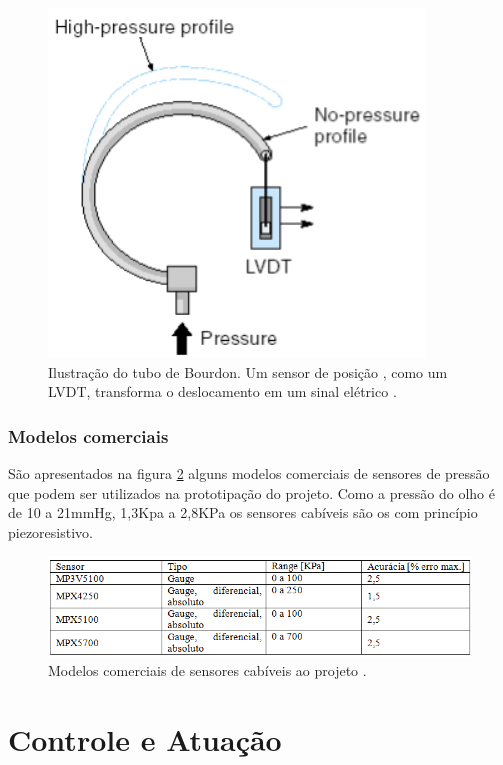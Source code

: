 \begin{anexosenv}
\begin{figure}[htb]
		\centering
			\includegraphics[scale=0.7]{figuras/bourdon.png}
		\caption{Ilustração do tubo de Bourdon. Um sensor de posição , como um LVDT, transforma o deslocamento em um sinal elétrico \cite{geomar}.}
		\label{fig17}
\end{figure}

\subsubsection[Modelos comerciais]{Modelos comerciais}

São apresentados  na figura \ref{fig18} alguns modelos comerciais de sensores de pressão que podem ser utilizados na prototipação do projeto. Como a pressão do olho é de 10 a 21mmHg, 1,3Kpa a 2,8KPa os sensores cabíveis são os com princípio piezoresistivo.

\begin{figure}[htb]
		\centering
			\includegraphics[scale=0.8]{figuras/pressaocomerciais.png}
		\caption{Modelos comerciais de sensores cabíveis ao projeto \cite{free2}.}
		\label{fig18}
\end{figure}







\section[Controle e Atuação]{Controle e Atuação}


\end{anexosenv}
